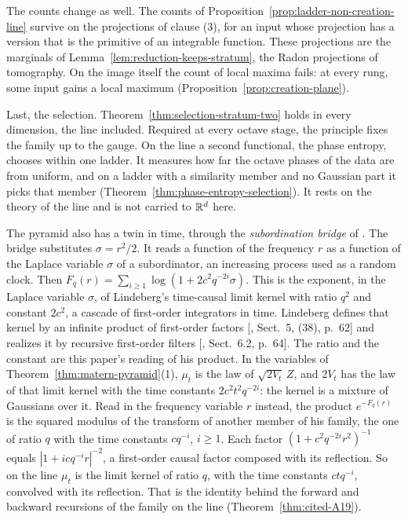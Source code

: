 The counts change as well. The counts of Proposition~\ref{prop:ladder-non-creation-line} survive on
the projections of clause (3), for an input whose projection has a version that is the primitive of
an integrable function. These projections are the marginals of
Lemma~\ref{lem:reduction-keeps-stratum}, the Radon projections of tomography. On the image itself
the count of local maxima fails: at every rung, some input gains a local maximum
(Proposition~\ref{prop:creation-plane}).

Last, the selection. Theorem~\ref{thm:selection-stratum-two} holds in every dimension, the line
included. Required at every octave stage, the principle fixes the family up to the gauge. On the
line a second functional,
the phase entropy, chooses within one ladder. It measures how far the octave phases of the \Levy{}
data are from uniform, and on a ladder with a similarity member and no Gaussian part it picks that
member (Theorem~\ref{thm:phase-entropy-selection}). It rests on the theory of the line and is not
carried to $\mathbb{R}^d$ here.

The pyramid also has a twin in time, through the \emph{subordination bridge} of
. The bridge substitutes $\sigma = r^2/2$. It reads a function of the
frequency $r$ as a function of the Laplace variable $\sigma$ of a subordinator, an increasing
\Levy{} process used as a random clock. Then $F_q(r) = \sum_{i \ge 1}\log(1 + 2c^2q^{-2i}\sigma)$.
This is the exponent, in the Laplace variable $\sigma$, of Lindeberg's time-causal limit kernel
with ratio $q^2$ and constant $2c^2$, a cascade of first-order integrators in time. Lindeberg
defines that kernel by an infinite product of first-order factors
[, Sect.~5, (38), p.~62] and realizes it by recursive first-order filters
[, Sect.~6.2, p.~64]. The ratio and the constant are this paper's reading
of his product. In the variables of Theorem~\ref{thm:matern-pyramid}(1), $\mu_t$ is the law of
$\sqrt{2V_t}\,Z$, and $2V_t$ has the law of that limit kernel with the time constants
$2c^2t^2q^{-2i}$: the kernel is a mixture of Gaussians over it. Read in the frequency variable $r$
instead, the product $e^{-F_q(r)}$ is the squared modulus of the transform of another member of his
family, the one of ratio $q$ with the time constants $cq^{-i}$, $i \ge 1$. Each factor
$(1 + c^2q^{-2i}r^2)^{-1}$ equals $|1 + icq^{-i}r|^{-2}$, a first-order causal factor composed with
its reflection. So on the line $\mu_t$ is the limit kernel of ratio $q$, with the time constants
$ctq^{-i}$, convolved with its reflection. That is the
identity behind the forward and backward recursions of the \Matern{} family on the line
(Theorem~\ref{thm:cited-A19}).

